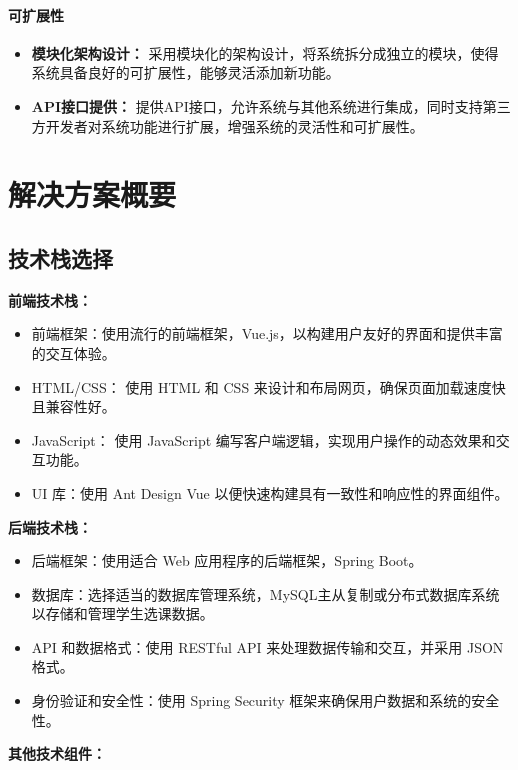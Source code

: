 \documentclass{article}
\begin{document}
\paragraph{可扩展性}
\begin{itemize}
	\item \textbf{模块化架构设计：}  采用模块化的架构设计，将系统拆分成独立的模块，使得系统具备良好的可扩展性，能够灵活添加新功能。
	\item \textbf{API接口提供：} 提供API接口，允许系统与其他系统进行集成，同时支持第三方开发者对系统功能进行扩展，增强系统的灵活性和可扩展性。
\end{itemize}


\section{解决方案概要}
\subsection{技术栈选择}
\textbf{前端技术栈：}

\begin{itemize}
    \item 前端框架：使用流行的前端框架，Vue.js，以构建用户友好的界面和提供丰富的交互体验。
    \item HTML/CSS： 使用 HTML 和 CSS 来设计和布局网页，确保页面加载速度快且兼容性好。
    \item JavaScript： 使用 JavaScript 编写客户端逻辑，实现用户操作的动态效果和交互功能。
    \item UI 库：使用 Ant Design Vue 以便快速构建具有一致性和响应性的界面组件。
\end{itemize}

\textbf{后端技术栈：}

\begin{itemize}
    \item 后端框架：使用适合 Web 应用程序的后端框架，Spring Boot。
    \item 数据库：选择适当的数据库管理系统，MySQL主从复制或分布式数据库系统 以存储和管理学生选课数据。
    \item API 和数据格式：使用 RESTful API 来处理数据传输和交互，并采用 JSON 格式。
    \item 身份验证和安全性：使用 Spring Security 框架来确保用户数据和系统的安全性。
\end{itemize}

\textbf{其他技术组件：}
\end{document}
